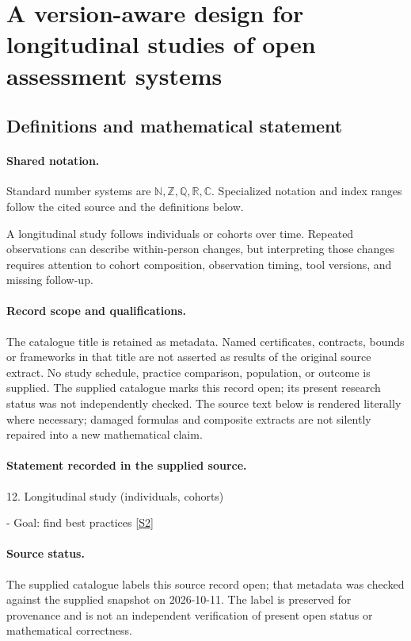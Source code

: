 \documentclass[11pt]{article}
\newcommand{\sref}[2]{\hyperlink{source:#1:#2}{[S#2]}}
\begin{document}
\section{A version-aware design for longitudinal studies of open assessment systems}\label{statement}

\subsection{Definitions and mathematical statement}

\paragraph{Shared notation.}Standard number systems are $\mathbb N,\mathbb Z,\mathbb Q,\mathbb R,\mathbb C$. Specialized notation and index ranges follow the cited source and the definitions below.


A longitudinal study follows individuals or cohorts over time. Repeated observations can describe within-person changes, but interpreting those changes requires attention to cohort composition, observation timing, tool versions, and missing follow-up.
\paragraph{Record scope and qualifications.}
The catalogue title is retained as metadata. Named certificates, contracts, bounds or frameworks in that title are not asserted as results of the original source extract.
No study schedule, practice comparison, population, or outcome is supplied. The supplied catalogue marks this record open; its present research status was not independently checked.
The source text below is rendered literally where necessary; damaged formulas and composite extracts are not silently repaired into a new mathematical claim.
\paragraph{Statement recorded in the supplied source.}
12. Longitudinal study (individuals, cohorts)

- Goal: find best practices \sref{statement}{2}
\paragraph{Source status.}
The supplied catalogue labels this source record open; that metadata was checked against the supplied snapshot on 2026-10-11. The label is preserved for provenance and is not an independent verification of present open status or mathematical correctness.
\end{document}
